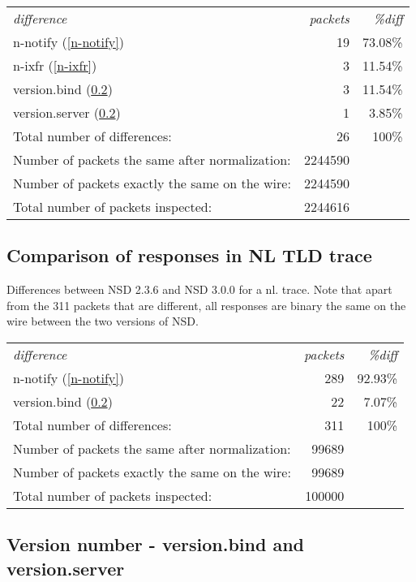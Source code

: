 \documentclass[twoside,titlepage,english]{nlnetlabs}
\begin{document}
\begin{tabular}{lrr}
{\em difference}			& {\em packets} & {\em \%diff}	\\
n-notify (\ref{n-notify})               & 19 &  73.08\% \\
n-ixfr (\ref{n-ixfr})                   & 3 &  11.54\% \\
version.bind (\ref{nsd-version})       & 3 & 11.54\% \\
version.server (\ref{nsd-version})   & 1  &  3.85\% \\
Total number of differences:            & 26 &  100\% \\
Number of packets the same after normalization:&2244590 \\
Number of packets exactly the same on the wire:&2244590 \\
Total number of packets inspected:             &2244616 \\
\end{tabular}


\subsection{Comparison of responses in NL TLD trace}

Differences between NSD 2.3.6 and NSD 3.0.0 for a nl. trace.
Note that apart from the 311 packets that are different, all responses are
binary the same on the wire between the two versions of NSD.

\begin{tabular}{lrr}
{\em difference}			& {\em packets} & {\em \%diff}	\\
n-notify (\ref{n-notify}) 		& 289 & 92.93\% \\
version.bind (\ref{nsd-version}) 	& 22  & 7.07\% \\
Total number of differences: 			   & 311 	& 100\% \\
Number of packets the same after normalization:& 99689 \\
Number of packets exactly the same on the wire:& 99689 \\
Total number of packets inspected: 	&100000 \\
\end{tabular}


\subsection{Version number - version.bind and version.server}
\label{nsd-version}
\end{document}
